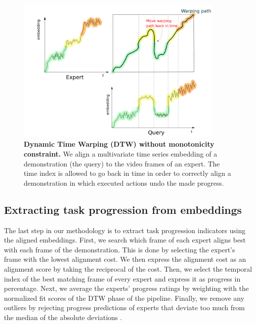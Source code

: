 \documentclass[\home/main.tex]{subfiles}
\begin{document}
\begin{figure}[htbp]
    \centering
    \includegraphics[width=0.90\textwidth, keepaspectratio]{figures/figs_dtw_backwards_v05.png}
    \caption[Dynamic Time Warping (DTW) without monotonicity constraint.]{\textbf{Dynamic Time Warping (DTW) without monotonicity constraint.} We align a multivariate time series embedding of a demonstration (the query) to the video frames of an expert. The time index is allowed to go back in time in order to correctly align a demonstration in which executed actions undo the made progress.}
    \label{fig:dtw}
\end{figure}

\subsection{Extracting task progression from embeddings} \label{subsec:rewards_extract}
The last step in our methodology is to extract task progression indicators using the aligned embeddings. First, we search which frame of each expert aligns best with each frame of the demonstration. This is done by selecting the expert's frame with the lowest alignment cost. We then express the alignment cost as an alignment score by taking the reciprocal of the cost. Then, we select the temporal index of the best matching frame of every expert and express it as progress in percentage. Next, we average the experts' progress ratings by weighting with the normalized fit scores of the DTW phase of the pipeline. Finally, we remove any outliers by rejecting progress predictions of experts that deviate too much from the median of the absolute deviations \autocite{Leys2013}.

\end{document}
